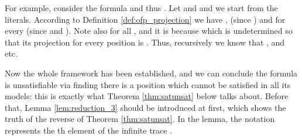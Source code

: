 \documentclass[conference]{IEEEtran}
\begin{document}
For example, 
consider the formula  and thus . 
Let  and  and we start from the literals. According to 
Definition \ref{def:ofp_projection} we have , 
 (since ) and  for every  (since  and 
). Note also  for all , and it is because  which is 
undetermined so that its projection for every position is . 
Thus, recursively we know that ,  and etc.

Now the whole framework has been established, and we can conclude the formula  is 
unsatisfiable via finding there is a position which cannot be satisfied in all its models: this is exactly what 
Theorem \ref{thm:satunsat} below talks about. Before that, Lemma \ref{lem:reduction_3}  should be introduced at first, which shows the truth of the reverse of Theorem \ref{thm:satunsat}. In the lemma, the notation  represents the th 
element of the infinite trace .
\end{document}
